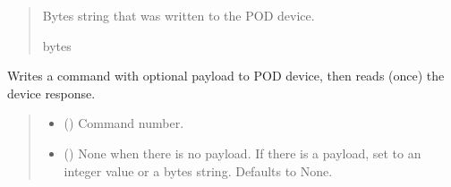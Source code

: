 \documentclass[letterpaper,10pt,english]{sphinxmanual}
\begin{document}
\begin{fulllineitems}
\begin{fulllineitems}
\begin{quote}
\begin{description}
\sphinxAtStartPar
Bytes string that was written to the POD device.

\sphinxAtStartPar
bytes

\end{description}\end{quote}

\end{fulllineitems}


\begin{fulllineitems}
\label{\detokenize{BasicPodProtocol:BasicPodProtocol.POD_Basics.WriteRead}}
\pysigstartsignatures
{}
\pysigstopsignatures
\sphinxAtStartPar
Writes a command with optional payload to POD device, then reads (once) the device response.
\begin{quote}\begin{description}
\begin{itemize}
\item {} 
\sphinxAtStartPar
{} (\sphinxstyleliteralemphasis{\sphinxupquote{ | }}) \textendash{} Command number.

\item {} 
\sphinxAtStartPar
{} (\sphinxstyleliteralemphasis{\sphinxupquote{ | }}\sphinxstyleliteralemphasis{\sphinxupquote{ | }}\sphinxstyleliteralemphasis{\sphinxupquote{{[}}}\sphinxstyleliteralemphasis{\sphinxupquote{|}}\sphinxstyleliteralemphasis{\sphinxupquote{{]}}}\sphinxstyleliteralemphasis{\sphinxupquote{, }}) \textendash{} None when there is no payload. If there                 is a payload, set to an integer value or a bytes string. Defaults to None.


\end{itemize}
\end{description}
\end{quote}
\end{fulllineitems}
\end{fulllineitems}
\end{document}
